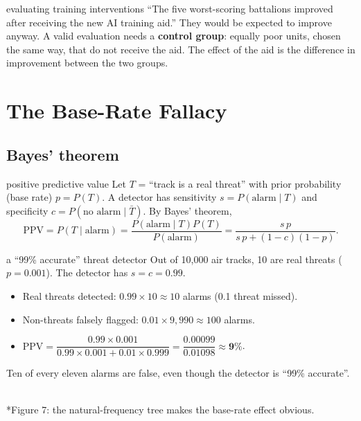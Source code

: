 \documentclass[11pt]{article}
\begin{document}
\begin{defence}{evaluating training interventions}
``The five worst-scoring battalions improved after receiving the new AI training aid.'' They would be expected to improve anyway. A valid evaluation needs a \textbf{control group}: equally poor units, chosen the same way, that do not receive the aid. The effect of the aid is the difference in improvement between the two groups.
\end{defence}

\section{The Base-Rate Fallacy}\label{sec:baserate}
\subsection{Bayes' theorem}
\begin{derivation}{positive predictive value}
Let $T$ = ``track is a real threat'' with prior probability (base rate) $p=P(T)$. A detector has sensitivity $s=P(\text{alarm}\mid T)$ and specificity $c=P(\text{no alarm}\mid\bar T)$. By Bayes' theorem,
\[\text{PPV}=P(T\mid\text{alarm})=\frac{P(\text{alarm}\mid T)P(T)}{P(\text{alarm})}=\frac{s\,p}{s\,p+(1-c)(1-p)}.\]
\end{derivation}

\begin{example}{a ``99\% accurate'' threat detector}
Out of 10,000 air tracks, 10 are real threats ($p=0.001$). The detector has $s=c=0.99$.
\begin{itemize}
\item Real threats detected: $0.99\times10\approx10$ alarms (0.1 threat missed).
\item Non-threats falsely flagged: $0.01\times9{,}990\approx100$ alarms.
\item $\text{PPV}=\dfrac{0.99\times0.001}{0.99\times0.001+0.01\times0.999}=\dfrac{0.00099}{0.01098}\approx\mathbf{9\%}$.
\end{itemize}
Ten of every eleven alarms are false, even though the detector is ``99\% accurate''.
\end{example}

\begin{center}\\*{\small\color{GreyN}Figure 7: the natural-frequency tree makes the base-rate effect obvious.}\end{center}
\end{document}
